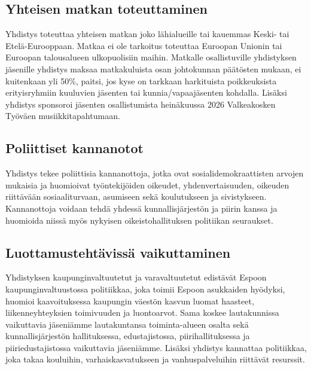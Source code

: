 \documentclass[a4paper,12pt]{article}
\begin{document}
\subsection{Yhteisen matkan toteuttaminen}
Yhdistys toteuttaa yhteisen matkan joko lähialueille tai kauemmas Keski- tai Etelä-Eurooppaan. Matkaa ei ole tarkoitus toteuttaa Euroopan Unionin tai Euroopan talousalueen ulkopuolisiin maihin. Matkalle osallistuville yhdistyksen jäsenille yhdistys maksaa matkakuluista osan johtokunnan päätösten mukaan, ei kuitenkaan yli 50\%, paitsi, jos kyse on tarkkaan harkituista poikkeuksista erityisryhmiin kuuluvien jäsenten tai kunnia/vapaajäsenten kohdalla. Lisäksi yhdistys sponsoroi jäsenten osallistumista heinäkuussa 2026 Valkeakosken Työväen musiikkitapahtumaan.
\subsection{Poliittiset kannanotot}
Yhdistys tekee poliittisia kannanottoja, jotka ovat sosialidemokraattisten arvojen mukaisia ja huomioivat työntekijöiden oikeudet, yhdenvertaisuuden, oikeuden riittävään sosiaaliturvaan, asumiseen sekä koulutukseen ja sivistykseen. Kannanottoja voidaan tehdä yhdessä kunnallisjärjestön ja piirin kanssa ja huomioida niissä myös nykyisen oikeistohallituksen politiikan seuraukset.
\subsection{Luottamustehtävissä vaikuttaminen}
Yhdistyksen kaupunginvaltuutetut ja varavaltuutetut edistävät Espoon kaupunginvaltuustossa politiikkaa, joka toimii Espoon asukkaiden hyödyksi, huomioi kaavoituksessa kaupungin väestön kasvun luomat haasteet, liikenneyhteyksien toimivuuden ja luontoarvot. Sama koskee lautakunnissa vaikuttavia jäseniämme lautakuntansa toiminta-alueen osalta sekä kunnallisjärjestön hallituksessa, edustajistossa, piirihallituksessa ja piiriedustajistossa vaikuttavia jäseniämme. Lisäksi yhdistys kannattaa politiikkaa, joka takaa kouluihin, varhaiskasvatukseen ja vanhuspalveluihin riittävät resurssit.
\end{document}
